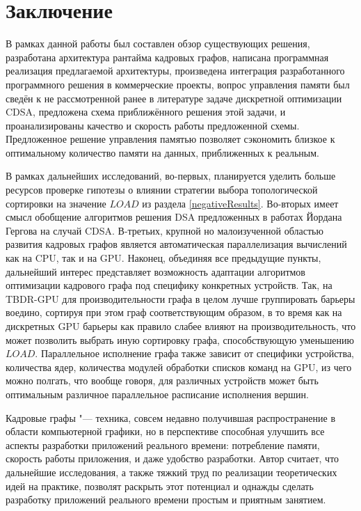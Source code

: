 \section{Заключение}
В рамках данной работы был составлен обзор существующих решения, разработана архитектура рантайма кадровых графов, написана программная реализация предлагаемой архитектуры, произведена интеграция разработанного программного решения в коммерческие проекты, вопрос управления памяти был сведён к не рассмотренной ранее в литературе задаче дискретной оптимизации CDSA, предложена схема приближённого решения этой задачи, и проанализированы качество и скорость работы предложенной схемы.
Предложенное решение управления памятью позволяет сэкономить близкое к оптимальному количество памяти на данных, приближенных к реальным.

В рамках дальнейших исследований, во-первых, планируется уделить больше ресурсов проверке гипотезы о влиянии стратегии выбора топологической сортировки на значение $LOAD$ из раздела \ref{negativeResults}.
Во-вторых имеет смысл обобщение алгоритмов решения DSA предложенных в работах Йордана Гергова \cite{gergov_approximation_1996, gergov_algorithms_1999} на случай CDSA.
В-третьих, крупной но малоизученной областью развития кадровых графов является автоматическая параллелизация вычислений как на CPU, так и на GPU.
Наконец, объединяя все предыдущие пункты, дальнейший интерес представляет возможность адаптации алгоритмов оптимизации кадрового графа под специфику конкретных устройств. Так, на TBDR-GPU для производительности графа в целом лучше группировать барьеры воедино, сортируя при этом граф соответствующим образом, в то время как на дискретных GPU барьеры как правило слабее влияют на производительность, что может позволить выбрать иную сортировку графа, способствующую уменьшению $LOAD$. Параллельное исполнение графа также зависит от специфики устройства, количества ядер, количества модулей обработки списков команд на GPU, из чего можно полгать, что вообще говоря, для различных устройств может быть оптимальным различное параллельное расписание исполнения вершин.

Кадровые графы "--- техника, совсем недавно получившая распространение в области компьютерной графики, но в перспективе способная улучшить все аспекты разработки приложений реального времени: потребление памяти, скорость работы приложения, и даже удобство разработки. Автор считает, что дальнейшие исследования, а также тяжкий труд по реализации теоретических идей на практике, позволят раскрыть этот потенциал и однажды сделать разработку приложений реального времени простым и приятным занятием.
